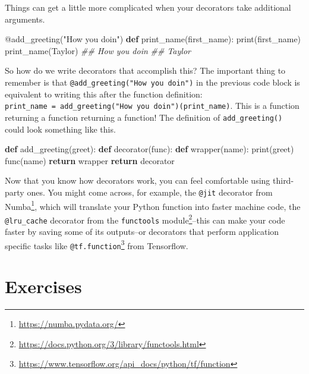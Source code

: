 \documentclass[
  12pt,
  krantz2]{krantz}
\makeatletter
\newenvironment{Shaded}{\begin{snugshade}}{\end{snugshade}}
\newcommand{\AttributeTok}[1]{\textcolor[rgb]{0.61,0.61,0.61}{#1}}
\newcommand{\BuiltInTok}[1]{#1}
\newcommand{\CommentTok}[1]{\textcolor[rgb]{0.37,0.37,0.37}{\textit{#1}}}
\newcommand{\ControlFlowTok}[1]{\textcolor[rgb]{0.27,0.27,0.27}{\textbf{#1}}}
\newcommand{\KeywordTok}[1]{\textcolor[rgb]{0.27,0.27,0.27}{\textbf{#1}}}
\newcommand{\NormalTok}[1]{#1}
\newcommand{\StringTok}[1]{\textcolor[rgb]{0.5,0.5,0.5}{#1}}
\renewcommand{\href}[2]{#2\footnote{\url{#1}}}
\newenvironment{kframe}{%
\medskip{}
\setlength{\fboxsep}{.8em}
 \def\at@end@of@kframe{}%
 \ifinner\ifhmode%
  \def\at@end@of@kframe{\end{minipage}}%
  \begin{minipage}{\columnwidth}%
 \fi\fi%
 \def\FrameCommand##1{\hskip\@totalleftmargin \hskip-\fboxsep
 \colorbox{shadecolor}{##1}\hskip-\fboxsep
     \hskip-\linewidth \hskip-\@totalleftmargin \hskip\columnwidth}%
 \MakeFramed {\advance\hsize-\width
   \@totalleftmargin\z@ \linewidth\hsize
   \@setminipage}}%
 {\par\unskip\endMakeFramed%
 \at@end@of@kframe}
\renewenvironment{Shaded}{\begin{kframe}}{\end{kframe}}
\makeatother
\begin{document}
Things can get a little more complicated when your decorators take additional arguments.

\begin{Shaded}
\begin{Highlighting}[]
\AttributeTok{@add\_greeting}\NormalTok{(}\StringTok{"How you doin\textquotesingle{}"}\NormalTok{)}
\KeywordTok{def}\NormalTok{ print\_name(first\_name):}
    \BuiltInTok{print}\NormalTok{(first\_name)}
\NormalTok{print\_name(}\StringTok{\textquotesingle{}Taylor\textquotesingle{}}\NormalTok{)}
\CommentTok{\#\# How you doin\textquotesingle{}}
\CommentTok{\#\# Taylor}
\end{Highlighting}
\end{Shaded}

So how do we write decorators that accomplish this? The important thing to remember is that \texttt{@add\_greeting("How\ you\ doin\textquotesingle{}")} in the previous code block is equivalent to writing this after the function definition: \texttt{print\_name\ =\ add\_greeting("How\ you\ doin\textquotesingle{}")(print\_name)}. This is a function returning a function returning a function! The definition of \texttt{add\_greeting()} could look something like this.

\begin{Shaded}
\begin{Highlighting}[]
\KeywordTok{def}\NormalTok{ add\_greeting(greet):}
    \KeywordTok{def}\NormalTok{ decorator(func):}
        \KeywordTok{def}\NormalTok{ wrapper(name):}
            \BuiltInTok{print}\NormalTok{(greet)}
\NormalTok{            func(name)}
        \ControlFlowTok{return}\NormalTok{ wrapper}
    \ControlFlowTok{return}\NormalTok{ decorator}
\end{Highlighting}
\end{Shaded}

Now that you know how decorators work, you can feel comfortable using third-party ones. You might come across, for example, the \texttt{@jit} decorator from \href{https://numba.pydata.org/}{Numba}, which will translate your Python function into faster machine code, the \texttt{@lru\_cache} decorator from the \href{https://docs.python.org/3/library/functools.html}{\texttt{functools} module}--this can make your code faster by saving some of its outputs--or decorators that perform application specific tasks like \href{https://www.tensorflow.org/api_docs/python/tf/function}{\texttt{@tf.function}} from Tensorflow.

\hypertarget{exercises-13}{%
\section{Exercises}\label{exercises-13}}
\end{document}
